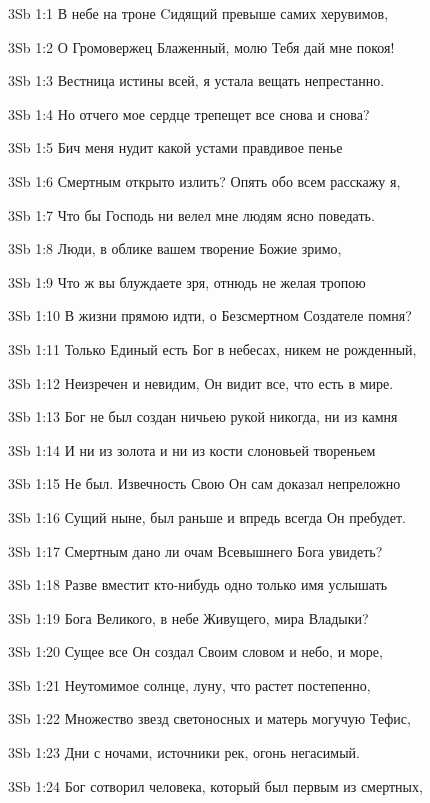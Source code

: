 \vs 3Sb 1:1 В небе на троне Cидящий превыше самих херувимов, 

\vs 3Sb 1:2 О Громовержец Блаженный, молю Тебя  дай мне покоя! 

\vs 3Sb 1:3 Вестница истины всей, я устала вещать непрестанно. 

\vs 3Sb 1:4 Но отчего мое сердце трепещет все снова и снова? 

\vs 3Sb 1:5 Бич меня нудит какой устами правдивое пенье

\vs 3Sb 1:6 Смертным открыто излить? Опять обо всем расскажу я, 

\vs 3Sb 1:7 Что бы Господь ни велел мне людям ясно поведать.

\vs 3Sb 1:8 Люди, в облике вашем творение Божие зримо, 

\vs 3Sb 1:9 Что ж вы блуждаете зря, отнюдь не желая тропою

\vs 3Sb 1:10 В жизни прямою идти, о Безсмертном Создателе помня? 

\vs 3Sb 1:11 Только Единый есть Бог  в небесах, никем не рожденный,

\vs 3Sb 1:12 Неизречен и невидим, Он видит все, что есть в мире. 

\vs 3Sb 1:13 Бог не был создан ничьею рукой никогда, ни из камня 

\vs 3Sb 1:14 И ни из золота и ни из кости слоновьей твореньем

\vs 3Sb 1:15 Не был. Извечность Свою Он сам доказал непреложно  

\vs 3Sb 1:16 Сущий ныне, был раньше и впредь всегда Он пребудет. 

\vs 3Sb 1:17 Смертным дано ли очам Всевышнего Бога увидеть? 

\vs 3Sb 1:18 Разве вместит кто-нибудь одно только имя услышать 

\vs 3Sb 1:19 Бога Великого, в небе Живущего, мира Владыки?

\vs 3Sb 1:20 Сущее все Он создал Своим словом  и небо, и море, 

\vs 3Sb 1:21 Неутомимое солнце, луну, что растет постепенно, 

\vs 3Sb 1:22 Множество звезд светоносных и матерь могучую Тефис, 

\vs 3Sb 1:23 Дни с ночами, источники рек, огонь негасимый. 

\vs 3Sb 1:24 Бог сотворил человека, который был первым из смертных,

